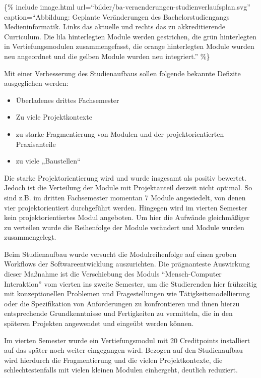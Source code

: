 \{\% include image.html
url=``bilder/ba-veraenderungen-studienverlaufsplan.svg''
caption=``Abbildung: Geplante Veränderungen des Bachelorstudiengangs
Medieninformatik. Links das aktuelle und rechts das zu akkreditierende
Curriculum. Die lila hinterlegten Module werden gestrichen, die grün
hinterlegten in Vertiefungsmodulen zusammengefasst, die orange
hinterlegten Module wurden neu angeordnet und die gelben Module wurden
neu integriert.'' \%\}

Mit einer Verbesserung des Studienaufbaus sollen folgende bekannte
Defizite ausgeglichen werden:

\begin{itemize}
\tightlist
\item
  Überladenes drittes Fachsemester
\item
  Zu viele Projektkontexte
\item
  zu starke Fragmentierung von Modulen und der projektorientierten
  Praxisanteile
\item
  zu viele „Baustellen``
\end{itemize}

Die starke Projektorientierung wird und wurde insgesamt als positiv
bewertet. Jedoch ist die Verteilung der Module mit Projektanteil derzeit
nicht optimal. So sind z.B. im dritten Fachsemester momentan 7 Module
angesiedelt, von denen vier projektorientiert durchgeführt werden.
Hingegen wird im vierten Semester kein projektorientiertes Modul
angeboten. Um hier die Aufwände gleichmäßiger zu verteilen wurde die
Reihenfolge der Module verändert und Module wurden zusammengelegt.

Beim Studienaufbau wurde versucht die Modulreihenfolge auf einen groben
Workflows der Softwareentwicklung auszurichten. Die prägnanteste
Auswirkung dieser Maßnahme ist die Verschiebung des Moduls
``Mensch-Computer Interaktion'' vom vierten ins zweite Semester, um die
Studierenden hier frühzeitig mit konzeptionellen Problemen und
Fragestellungen wie Tätigkeitsmodellierung oder die Spezifikation von
Anforderungen zu konfrontieren und ihnen hierzu entsprechende
Grundkenntnisse und Fertigkeiten zu vermitteln, die in den späteren
Projekten angewendet und eingeübt werden können.

Im vierten Semester wurde ein Vertiefungsmodul mit 20 Creditpoints
installiert auf das später noch weiter eingegangen wird. Bezogen auf den
Studienaufbau wird hierdurch die Fragmentierung und die vielen
Projektkontexte, die schlechtestenfalls mit vielen kleinen Modulen
einhergeht, deutlich reduziert.

